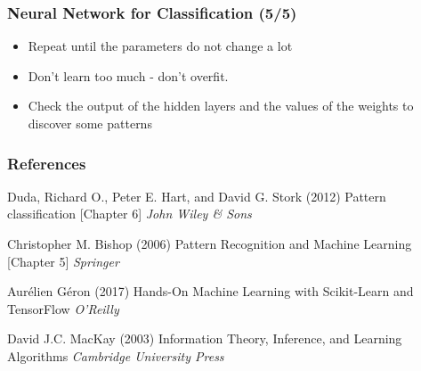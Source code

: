 \documentclass{beamer}
\begin{document}
\begin{frame}
\frametitle{Neural Network for Classification (5/5)}

\begin{itemize}
\item Repeat until the parameters do not change a lot
\item Don't learn too much - don't overfit.
\item Check the output of the hidden layers and the values of the weights to discover some patterns 
\end{itemize}

\end{frame}

\begin{thebibliography}{99} %

\begin{frame}
\frametitle{References}

 Duda, Richard O., Peter E. Hart, and David G. Stork (2012)
\newblock Pattern classification [Chapter 6]
\newblock \emph{John Wiley \& Sons}

 Christopher M. Bishop (2006)
\newblock Pattern Recognition and Machine Learning [Chapter 5]
\newblock \emph{Springer}

 Aur\'elien G\'eron (2017)
\newblock Hands-On Machine Learning with Scikit-Learn and TensorFlow
\newblock \emph{O'Reilly}

 David J.C. MacKay (2003)
\newblock Information Theory, Inference, and Learning Algorithms
\newblock \emph{Cambridge University Press}

\end{frame}

\end{thebibliography}

\end{document}
